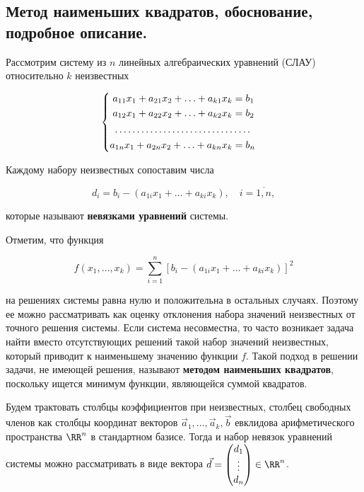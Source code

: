 \subsection{
    Метод наименьших квадратов, обоснование, подробное описание.
}

Рассмотрим систему из $n$ линейных алгебраических уравнений (СЛАУ) относительно $k$ неизвестных

\begin{equation}
    \begin{cases}
        \begin{aligned}
            a_{11} x_1 + a_{21} x_2 + \ldots + a_{k1} x_k &= b_1 \\
            a_{12} x_1 + a_{22} x_2 + \ldots + a_{k2} x_k &= b_2 \\
            \hdotsfor{2} \\
            a_{1n} x_1 + a_{2n} x_2 + \ldots + a_{kn} x_k &= b_n \\
        \end{aligned}
    \end{cases}
    \label{eq:slau_14_1}
\end{equation}

Каждому набору неизвестных сопоставим числа

$$d_i = b_i - (a_{1i}x_1 + \ldots + a_{ki}x_k), \quad i = \overline{1, n},$$

которые называют \textbf{невязками уравнений} системы.

Отметим, что функция 

$$f(x_1, \ldots, x_k) = \sum_{i=1}^{n} [b_i - (a_{1i}x_1 + \ldots + a_{ki}x_k)]^2$$

на решениях системы равна нулю и положительна в остальных случаях. Поэтому ее можно рассматривать как оценку отклонения набора значений неизвестных от точного решения системы. Если система несовместна, то часто возникает задача найти вместо отсутствующих решений такой набор значений неизвестных, который приводит к наименьшему значению функции $f$. Такой подход в решении задачи, не имеющей решения, называют \textbf{методом наименьших квадратов}, поскольку ищется минимум функции, являющейся суммой квадратов.

Будем трактовать столбцы коэффициентов при неизвестных, столбец свободных членов как столбцы координат векторов $\vec{a}_1, \ldots, \vec{a}_k, \vec{b}$ евклидова арифметического пространства $\RR^n$ в стандартном базисе. Тогда и набор невязок уравнений системы можно рассматривать в виде вектора $\vec{d} = \begin{pmatrix} d_1 \\ \vdots \\ d_n \end{pmatrix} \in \RR^n$.

